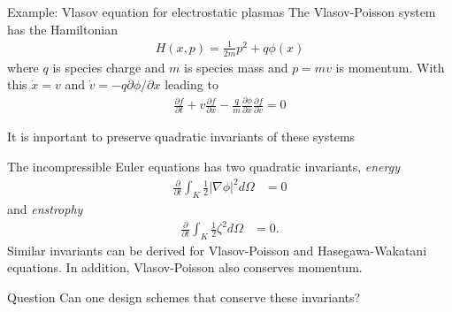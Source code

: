 \documentclass[pdf]{beamer}
\newcommand{\pfrac}[2]{\frac{\partial #1}{\partial #2}}
\newcommand{\pfraca}[1]{\frac{\partial}{\partial #1}}
\newcommand{\mypause}{}
\theoremstyle{definition}
\begin{document}
\begin{frame}{Example: Vlasov equation for electrostatic plasmas}%
  The Vlasov-Poisson system has the Hamiltonian
  \begin{align*}
    H(x,p) = \frac{1}{2m}p^2 + q\phi(x)
  \end{align*}
  where $q$ is species charge and $m$ is species mass and $p=mv$ is
  momentum. With this $\dot{x} = v$ and $\dot{v} =
  -q\partial\phi/\partial x$ leading to
  \begin{align*}
    \pfrac{f}{t} + v\pfrac{f}{x} -
    \frac{q}{m}\pfrac{\phi}{x}\pfrac{f}{v} = 0
  \end{align*}
\end{frame}

\begin{frame}{It is important to preserve quadratic invariants of
    these systems}%

  The incompressible Euler equations has two quadratic invariants,
  \emph{energy}
  \begin{align*}
    \pfraca{t}\int_K \frac{1}{2} |\nabla\phi|^2  d\Omega &= 0
  \end{align*}
  and \emph{enstrophy}
  \begin{align*}
    \pfraca{t}\int_K \frac{1}{2}\zeta^2 d\Omega &= 0.
  \end{align*}
  Similar invariants can be derived for Vlasov-Poisson and
  Hasegawa-Wakatani equations.  In addition, Vlasov-Poisson also
  conserves momentum.
  \mypause
  \begin{block}{Question}
    Can one design schemes that conserve these invariants?
  \end{block}

\end{frame}
\end{document}
